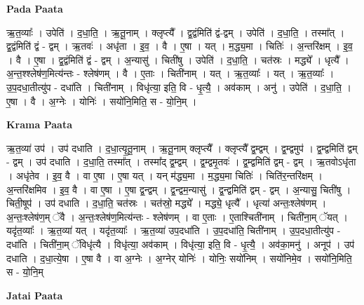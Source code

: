 \documentclass[17pt]{extarticle}
\begin{document}
\textbf{Pada Paata} \newline

ऋ॒त॒व्याः᳚ । उपेति॑ । द॒धा॒ति॒ । ऋ॒तू॒नाम् । क्लृप्त्यै᳚ । द्व॒द्वंमिति॑ द्वं-द्वम् । उपेति॑ । द॒धा॒ति॒ । तस्मा᳚त् । द्व॒द्वंमिति॑ द्वं - द्वम् । ऋ॒तवः॑ । अधृ॑ता । इ॒व॒ । वै । ए॒षा । यत् । म॒द्ध्य॒मा । चितिः॑ । अ॒न्तरि॑क्षम् । इ॒व॒ । वै । ए॒षा । द्व॒द्वंमिति॑ द्वं - द्वम् । अ॒न्यासु॑ । चिती॑षु । उपेति॑ । द॒धा॒ति॒ । चत॑स्रः । मद्ध्ये᳚ । धृत्यै᳚ । अ॒न्त॒श्श्लेष॑ण॒मित्य॑न्तः - श्लेष॑णम् । वै । ए॒ताः । चिती॑नाम् । यत् । ऋ॒त॒व्याः᳚ । यत् । ऋ॒त॒व्याः᳚ । उ॒प॒दधा॒तीत्यु॑प - दधा॑ति । चिती॑नाम् । विधृ॑त्या॒ इति॒ वि - धृ॒त्यै॒ । अव॑काम् । अनु॑ । उपेति॑ । द॒धा॒ति॒ । ए॒षा । वै । अ॒ग्नेः । योनिः॑ । सयो॑नि॒मिति॒ स - यो॒नि॒म् ।  \newline


\textbf{Krama Paata} \newline

ऋ॒त॒व्या॑ उप॑ । उप॑ दधाति । द॒धा॒त्यृ॒तू॒नाम् । ऋ॒तू॒नाम् क्लृप्त्यै᳚ । क्लृप्त्यै᳚ द्व॒म्द्वम् । द्व॒म्द्वमुप॑ । द्व॒म्द्वमिति॑ द्वम् - द्वम् । उप॑ दधाति । द॒धा॒ति॒ तस्मा᳚त् । तस्मा᳚द् द्व॒म्द्वम् । द्व॒म्द्वमृ॒तवः॑ । द्व॒म्द्वमिति॑ द्वम् - द्वम् । ऋ॒तवोऽधृ॑ता । अधृ॑तेव । इ॒व॒ वै । वा ए॒षा । ए॒षा यत् । यन् म॑द्ध्य॒मा । म॒द्ध्य॒मा चितिः॑ । चिति॑र॒न्तरि॑क्षम् । अ॒न्तरि॑क्षमिव । इ॒व॒ वै । वा ए॒षा । ए॒षा द्व॒न्द्वम् । द्व॒न्द्वम॒न्यासु॑ । द्व॒न्द्वमिति॑ द्वम् - द्वम् । अ॒न्यासु॒ चिती॑षु । चिती॒षूप॑ । उप॑ दधाति । द॒धा॒ति॒ चत॑स्रः । चत॑स्रो॒ मद्ध्ये᳚ । मद्ध्ये॒ धृत्यै᳚ । धृत्या॑ अन्तः॒श्लेष॑णम् । अ॒न्तः॒श्लेष॑ण॒म् ॅवै । अ॒न्तः॒श्लेष॑ण॒मित्य॑न्तः - श्लेष॑णम् । वा ए॒ताः । ए॒ताश्चिती॑नाम् । चिती॑ना॒म् ॅयत् । यदृ॑त॒व्याः᳚ । ऋ॒त॒व्या॑ यत् । यदृ॑त॒व्याः᳚ । ऋ॒त॒व्या॑ उप॒दधा॑ति । उ॒प॒दधा॑ति॒ चिती॑नाम् । उ॒प॒दधा॒तीत्यु॑प - दधा॑ति । चिती॑ना॒म् ॅविधृ॑त्यै । विधृ॑त्या॒ अव॑काम् । विधृ॑त्या॒ इति॒ वि - धृ॒त्यै॒ । अव॑का॒मनु॑ । अनूप॑ । उप॑ दधाति । द॒धा॒त्ये॒षा । ए॒षा वै । वा अ॒ग्नेः । अ॒ग्नेर् योनिः॑ । योनिः॒ सयो॑निम् । सयो॑निमे॒व । सयो॑नि॒मिति॒ स - यो॒नि॒म् \newline

\textbf{Jatai Paata} \newline
\end{document}
